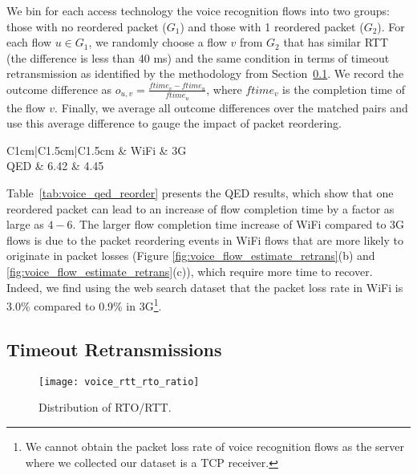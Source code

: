 We bin for each access technology the voice recognition flows into two groups: those with no reordered packet ($G_1$) and those with 1 reordered packet ($G_2$). For each flow $u \in G_1$, we randomly choose a flow $v$ from $G_2$ that has similar RTT (\ie the difference is less than 40 ms) and the same condition in terms of timeout retransmission as identified by the methodology from Section~\ref{sec:v_rto}. We record the outcome difference as $o_{u,v} = \frac{ftime_{v} - ftime_{u}}{ftime_{u}}$, where $ftime_v$ is the completion time of the flow $v$. Finally, we average all outcome differences over the matched pairs and use this average difference to gauge the impact of packet reordering.

\begin{table}[th]
\caption{QED results for the impact of packet reordering.}
\label{tab:voice_qed_reorder}
\centering
\renewcommand{\arraystretch}{1}
\begin{tabular}{C{1cm}|C{1.5cm}|C{1.5cm}}
	\hline
	 & WiFi & 3G \\
	\hline
	QED & 6.42 & 4.45 \\
	\hline
\end{tabular}
\minsqueeze
\end{table}

Table~\ref{tab:voice_qed_reorder} presents the QED results, which show that one reordered packet can lead to an increase of flow completion time by a factor as large as $4-6$. The larger flow completion time increase of WiFi compared to 3G flows is due to the packet reordering events in WiFi flows that are more likely to originate in packet losses (\ie Figure \ref{fig:voice_flow_estimate_retrans}(b) and \ref{fig:voice_flow_estimate_retrans}(c)), which require more time to recover. Indeed, we find using the web search dataset that the packet loss rate in WiFi is 3.0\% compared to 0.9\% in 3G\footnote{We cannot obtain the packet loss rate of voice recognition flows as the server where we collected our dataset is a TCP receiver.}. 

\subsection{Timeout Retransmissions}\label{sec:v_rto}

\begin{figure}[th]
\centering
	\texttt{[image: voice\_rtt\_rto\_ratio]}
\caption{Distribution of RTO/RTT.}
\label{fig:rto_rtt}
\minsqueeze
\end{figure}

